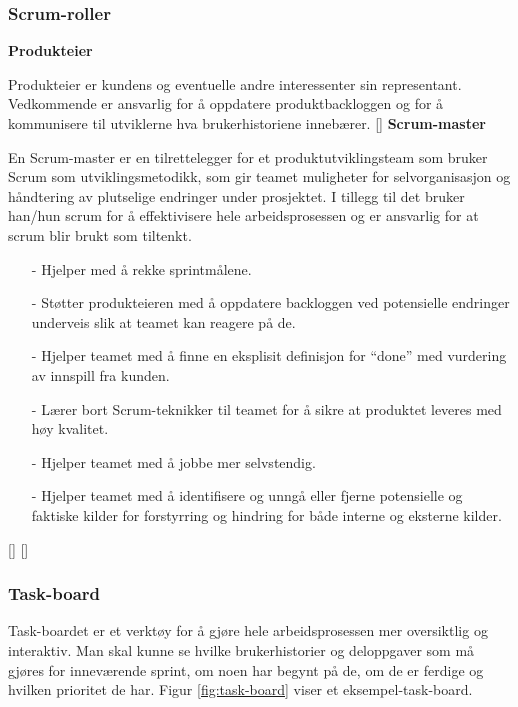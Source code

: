 \documentclass[12pt,a4paper,norsk]{article}
\begin{document}
	\subsubsection{Scrum-roller}\label{scrumroller}
	\textbf {Produkteier}
    \par Produkteier er kundens og eventuelle andre interessenter sin representant. Vedkommende er ansvarlig for å oppdatere  produktbackloggen og for å kommunisere til utviklerne hva brukerhistoriene innebærer.
    [\cite{scrumguides}]
    \textbf {Scrum-master}
    \par En Scrum-master er en tilrettelegger for et produktutviklingsteam som bruker Scrum som utviklingsmetodikk, som gir teamet muligheter for selvorganisasjon og håndtering av plutselige endringer under prosjektet. I tillegg til det bruker han/hun scrum for å effektivisere hele arbeidsprosessen og er ansvarlig for at scrum blir brukt som tiltenkt.
 
    \begin{itemize}
    \item[-] Hjelper med å rekke sprintmålene.
    \item[-] Støtter produkteieren med å oppdatere backloggen ved potensielle endringer underveis slik at teamet kan reagere på de.
    \item[-]  Hjelper teamet med å finne en eksplisit definisjon for “done” med vurdering av innspill fra kunden.
    \item[-]  Lærer bort Scrum-teknikker til teamet for å sikre at produktet leveres med høy kvalitet.
    \item[-]  Hjelper teamet med å jobbe mer selvstendig.
    \item[-]  Hjelper teamet med å identifisere og unngå eller fjerne             potensielle og faktiske kilder for forstyrring og hindring for både interne og eksterne kilder.
    \end{itemize}
    
    [\cite{scrummaster}]
    [\cite{scrummasterrolle}]
   
    
	
	\subsubsection{Task-board}
	Task-boardet er et verktøy for å gjøre hele arbeidsprosessen mer oversiktlig og interaktiv. Man skal kunne se hvilke brukerhistorier og deloppgaver som må gjøres for inneværende sprint, om noen har begynt på de, om de er ferdige og hvilken prioritet de har. Figur \ref{fig:task-board} viser et eksempel-task-board.
    
\end{document}
